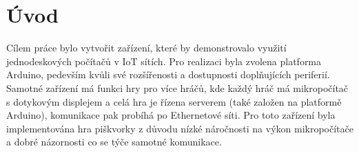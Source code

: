 \section{Úvod}
Cílem práce bylo vytvořit zařízení, které by demonstrovalo využití jednodeskových počítačů v IoT sítích. Pro realizaci byla zvolena platforma Arduino, pedevším kvůli své rozšířenosti a dostupnosti doplňujících periferií. Samotné zařízení má funkci hry pro více hráčů, kde každý hráč má mikropočítač s dotykovým displejem a celá hra je řízena serverem (také založen na platformě Arduino), komunikace pak probíhá po Ethernetové síti.  Pro toto zařízení byla implementována hra piškvorky z důvodu nízké náročnosti na výkon mikropočítače a dobré názornosti co se týče samotné komunikace.

\notFinished
